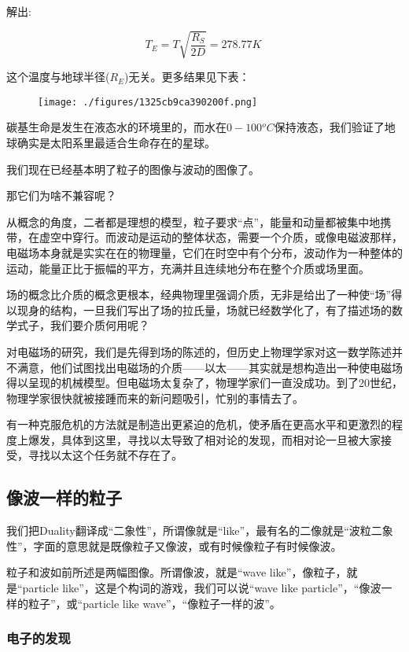 解出:

\begin{equation}
T_E = T \sqrt{\frac{R_S}{2D}} = 278.77 K~
\end{equation}

这个温度与地球半径($R_E$)无关。更多结果见下表：

\begin{figure}[ht]
\centering
\texttt{[image: ./figures/1325cb9ca390200f.png]}
\caption \label{fig_QMPre5_8}
\end{figure}

碳基生命是发生在液态水的环境里的，而水在$0 - 100 {}^o C$保持液态，我们验证了地球确实是太阳系里最适合生命存在的星球。

我们现在已经基本明了粒子的图像与波动的图像了。

那它们为啥不兼容呢？

从概念的角度，二者都是理想的模型，粒子要求“点”，能量和动量都被集中地携带，在虚空中穿行。而波动是运动的整体状态，需要一个介质，或像电磁波那样，电磁场本身就是实实在在的物理量，它们在时空中有个分布，波动作为一种整体的运动，能量正比于振幅的平方，充满并且连续地分布在整个介质或场里面。

场的概念比介质的概念更根本，经典物理里强调介质，无非是给出了一种使“场”得以现身的结构，一旦我们写出了场的拉氏量，场就已经数学化了，有了描述场的数学式子，我们要介质何用呢？

对电磁场的研究，我们是先得到场的陈述的，但历史上物理学家对这一数学陈述并不满意，他们试图找出电磁场的介质——以太——其实就是想构造出一种使电磁场得以呈现的机械模型。但电磁场太复杂了，物理学家们一直没成功。到了20世纪，物理学家很快就被接踵而来的新问题吸引，忙别的事情去了。

有一种克服危机的方法就是制造出更紧迫的危机，使矛盾在更高水平和更激烈的程度上爆发，具体到这里，寻找以太导致了相对论的发现，而相对论一旦被大家接受，寻找以太这个任务就不存在了。

\subsection{像波一样的粒子}

我们把Duality翻译成“二象性”，所谓像就是“like”，最有名的二像就是“波粒二象性”，字面的意思就是既像粒子又像波，或有时候像粒子有时候像波。

粒子和波如前所述是两幅图像。所谓像波，就是“wave like”，像粒子，就是“particle like”，这是个构词的游戏，我们可以说“wave like particle”，“像波一样的粒子”，或“particle like wave”，“像粒子一样的波”。

\subsubsection{电子的发现}

